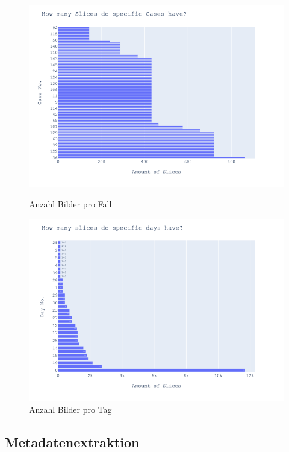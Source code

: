 \begin{figure}[!htb]
   \begin{minipage}{0.48\textwidth}
     \centering
     \includegraphics[width=1.2\linewidth]{bilder/slice_per_case}
     \caption{Anzahl Bilder pro Fall}\label{Fig:slice_per_case}
   \end{minipage}\hfill
   \begin{minipage}{0.48\textwidth}
     \centering
     \includegraphics[width=1.2\linewidth]{bilder/slices_per_day}
     \caption{Anzahl Bilder pro Tag}\label{Fig:slice_per_day}
   \end{minipage}
\end{figure}

\subsection{Metadatenextraktion}

